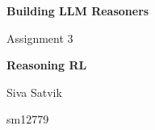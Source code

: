 \documentclass{article}
\begin{document}
\begin{titlepage}
    \centering
    \vspace*{2cm}
    
    {\Huge\bfseries Building LLM Reasoners\par}
    \vspace{0.5cm}
    {\Large Assignment 3\par}
    \vspace{2cm}
    
    {\Large\bfseries Reasoning RL\par}
    \vspace{3cm}
    
    {\Large Siva Satvik\par}
    \vspace{0.5cm}
    {\large sm12779\par}
    \vspace{2cm}
    
    \vfill
\end{titlepage}
\end{document}
